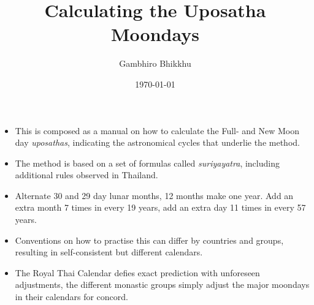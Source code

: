 \documentclass[11pt,oneside]{memoir-article}
\author{Gambhiro Bhikkhu}
\date{\today}
\title{Calculating the Uposatha Moondays}
\begin{document}
\maketitle
\begin{tldr}
\begin{itemize}
\item This is composed as a manual on how to calculate the Full- and New
Moon day \emph{uposathas}, indicating the astronomical cycles that
underlie the method.
\item The method is based on a set of formulas called \emph{suriyayatra},
including additional rules observed in Thailand.
\item Alternate 30 and 29 day lunar months, 12 months make one year. Add
an extra month 7 times in every 19 years, add an extra day 11 times
in every 57 years.
\item Conventions on how to practise this can differ by countries and
groups, resulting in self-consistent but different calendars.
\item The Royal Thai Calendar defies exact prediction with unforeseen
adjustments, the different monastic groups simply adjust the major
moondays in their calendars for concord.
\end{itemize}
\end{tldr}
\end{document}
